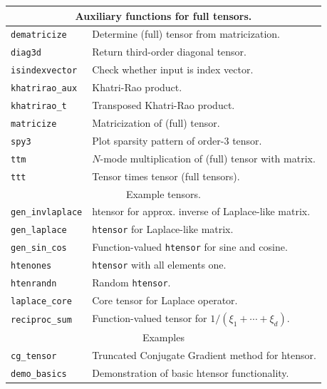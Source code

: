 \documentclass[11pt, a4paper]{article}
\begin{document}
\begin{preprint}
\begin{table} \small
\begin{tabular}{|p{4.4cm}|p{9.8cm}|}
 \hline
\multicolumn{2}{|c|}{Auxiliary functions for full tensors.} \\
\hline
\texttt{dematricize}        & Determine (full) tensor from matricization.\\
\texttt{diag3d}             & Return third-order diagonal tensor.\\
\texttt{isindexvector}      & Check whether input is index vector.\\
\texttt{khatrirao\_aux}     & Khatri-Rao product.\\
\texttt{khatrirao\_t}       & Transposed Khatri-Rao product.\\
\texttt{matricize}          & Matricization of (full) tensor.\\
\texttt{spy3}               & Plot sparsity pattern of order-$3$ tensor.\\
\texttt{ttm}                & $N$-mode multiplication of (full) tensor with matrix.\\
\texttt{ttt}                & Tensor times tensor (full tensors).\\
\hline \hline
\multicolumn{2}{|c|}{Example tensors.} \\
\hline
\texttt{gen\_invlaplace}     & htensor for approx. inverse of Laplace-like matrix.\\
\texttt{gen\_laplace}        & {\tt htensor} for Laplace-like matrix.\\
\texttt{gen\_sin\_cos}       & Function-valued {\tt htensor} for sine and cosine.\\
\texttt{htenones}           & {\tt htensor} with all elements one.\\
\texttt{htenrandn}          & Random {\tt htensor}.\\
\texttt{laplace\_core}       & Core tensor for Laplace operator.\\
\texttt{reciproc\_sum}             & Function-valued tensor for $1/(\xi_1 + \cdots + \xi_d)$.\\
\hline \hline
\multicolumn{2}{|c|}{Examples} \\
\hline
\texttt{cg\_tensor}             & Truncated Conjugate Gradient method for htensor.\\
\texttt{demo\_basics}           & Demonstration of basic htensor functionality.\\

\end{tabular}
\end{table}
\end{preprint}
\end{document}
